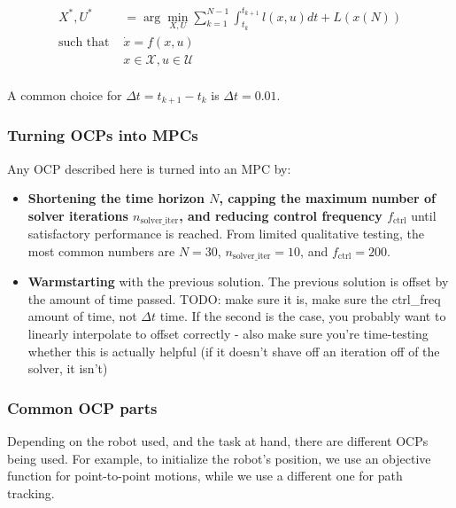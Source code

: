 \documentclass{article}
\newcommand{\argmin}{\arg\!\min}
\begin{document}
\begin{align}
X^{ * }, U^{ * } &= \argmin_{X,U} \sum_{k=1}^{N-1} \int_{t_{ k }}^{t_{ k+1 }} l (x,u) dt +L (x (N)) \\
\text{such that } & \dot{x} = f (x,u)\\
& x \in \mathcal{X}, u \in \mathcal{U}\\
\end{align}

A common choice for $ \Delta t = t_{ k+1 } - t_{ k }  $ is
$ \Delta t = 0.01  $.



\subsubsection{Turning OCPs into MPCs}
Any OCP described here is turned into an MPC by:
\begin{itemize}
\item \textbf{Shortening the time horizon $ N  $, capping the maximum number of
solver iterations $ n_{ \text{solver\_iter} }  $, 
and reducing control frequency $ f_{ \text{ctrl} }  $}
until satisfactory performance is reached. 
From limited qualitative testing, the most common numbers
are $ N = 30  $, $  n_{ \text{solver\_iter} } = 10   $,
and $ f_{ \text{ctrl} } = 200  $.
\item \textbf{Warmstarting} with the previous solution. 
		The previous solution is offset by the amount of time passed.
		TODO: make sure it is, make sure the ctrl\_freq amount of time, 
		not $ \Delta t  $ time. If the second is the case,
		you probably want to linearly interpolate to offset correctly
		- also make sure you're time-testing whether this is actually helpful
		(if it doesn't shave off an iteration off of the solver,
		it isn't)
\end{itemize}

\subsubsection{Common OCP parts}
Depending on the robot used, and the task at hand,
there are different OCPs being used.
For example, to initialize the robot's position, we use an objective
function for point-to-point motions,
while we use a different one for path tracking.
\end{document}
